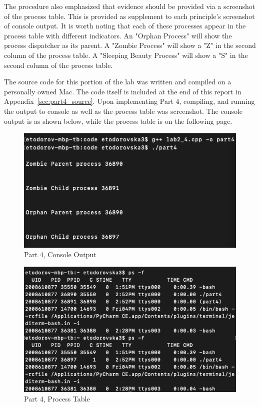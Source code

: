         \noindent The procedure also emphasized that evidence should be provided via a screenshot of the process table.
        This is provided as supplement to each principle's screenshot of console output.
        It is worth noting that each of these processes appear in the process table with different indicators.
        An "Orphan Process" will show the process dispatcher as its parent.
        A "Zombie Process" will show a "Z" in the second column of the process table.
        A "Sleeping Beauty Process" will show a "S" in the second column of the process table.

        \medskip
        \noindent The source code for this portion of the lab was written and compiled on a personally owned Mac.
        The code itself is included at the end of this report in Appendix~\ref{sec:part4_source}.
        Upon implementing Part 4, compiling, and running the output to console as well as the process table was screenshot.
        The console output is as shown below, while the process table is on the following page.

        \begin{figure}[H]
            \centering
            \includegraphics[width=\linewidth]{figures/Part4Output.png}
            \caption{Part 4, Console Output}
            \label{fig:part4_output}
        \end{figure}

        \begin{figure}[H]
            \centering
            \includegraphics[width=\linewidth]{figures/Part4ProcessTable.png}
            \caption{Part 4, Process Table}
            \label{fig:part4_output}
        \end{figure}
